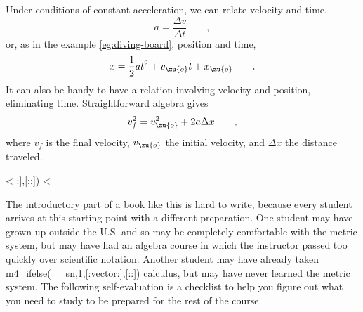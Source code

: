 Under conditions of constant acceleration,
we can relate velocity and time,
\begin{equation*}
  a = \frac{\Delta v}{\Delta t} \qquad ,
\end{equation*}
or, as in the example \ref{eg:diving-board}, position and time,
\begin{equation*}
  x =  \frac{1}{2}at^2 + v_\zu{o} t + x_\zu{o} \qquad .
\end{equation*}
It can also be handy to have a relation involving velocity and position, eliminating time.
Straightforward algebra gives
\begin{equation*}
  v_f^2 = v_\zu{o}^2 + 2 a \Delta x \qquad ,
\end{equation*}
where $v_f$ is the final velocity, $v_\zu{o}$ the initial velocity, and $\Delta x$ the
distance traveled.

\vspace{0mm plus 5mm}


\vspace{0mm plus 5mm}


\vspace{0mm plus 5mm}

<%
:],[::])%
<%

The introductory part of a book like this is hard to write,
because every student arrives at this starting point with a
different preparation. One student may have grown up
outside the U.S. and so may be completely comfortable with
the metric system, but may have had an algebra course in
which the instructor passed too quickly over scientific
notation. Another student may have already taken m4_ifelse(__sn,1,[:vector:],[::]) calculus,
but may have never learned the metric system. The following
self-evaluation is a checklist to help you figure out what
you need to study to be prepared for the rest of the course.

